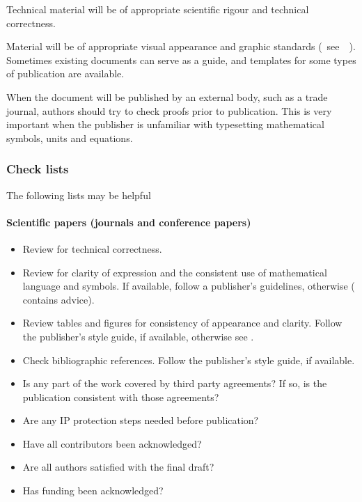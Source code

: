 Technical material will be of appropriate scientific rigour and technical correctness. 

Material will be of appropriate visual appearance and graphic standards (~see~\cite[\S\ref*{GRP-s:scientific_documents}]{MSL_Reporting_Guidelines}~). Sometimes existing documents can serve as a guide, and templates for some types of publication are available.  

When the document will be published by an external body, such as a trade journal, authors should try to check proofs prior to publication. This is very important when the publisher is unfamiliar with typesetting mathematical symbols, units and equations.  

\subsubsection{Check lists}
The following lists may be helpful
\paragraph{Scientific papers (journals and conference papers)}
\begin{itemize}
\item  Review for technical correctness.
\item  Review for clarity of expression and the consistent use of mathematical language and symbols.  If available, follow a publisher's guidelines, otherwise (\cite[\S\ref*{GRP-s:scientific_documents}]{MSL_Reporting_Guidelines} contains advice).
\item  Review tables and figures for consistency of appearance and clarity. Follow the publisher's style guide, if available, otherwise see \cite[\S\ref*{GRP-s:scientific_documents}]{MSL_Reporting_Guidelines}.
\item  Check bibliographic references. Follow the publisher's style guide, if available.
\item  Is any part of the work covered by third party agreements? If so, is the publication consistent with those agreements? 
\item  Are any IP protection steps needed before publication?
\item  Have all contributors been acknowledged?
\item  Are all authors satisfied with the final draft?
\item  Has funding been acknowledged?
\end{itemize}

